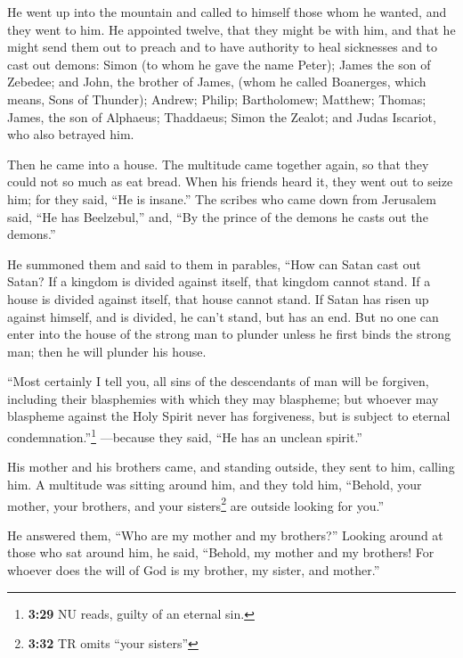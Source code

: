  He went up into the mountain and called to himself those
whom he wanted, and they went to him.  He appointed
twelve, that they might be with him, and that he might send them out to
preach  and to have authority to heal sicknesses and to
cast out demons:  Simon (to whom he gave the name Peter);
 James the son of Zebedee; and John, the brother of
James, (whom he called Boanerges, which means, Sons of Thunder);
 Andrew; Philip; Bartholomew; Matthew; Thomas; James, the
son of Alphaeus; Thaddaeus; Simon the Zealot;  and Judas
Iscariot, who also betrayed him.

Then he came into a house.  The multitude came together
again, so that they could not so much as eat bread.  When
his friends heard it, they went out to seize him; for they said, ``He is
insane.''  The scribes who came down from Jerusalem said,
``He has Beelzebul,'' and, ``By the prince of the demons he casts out
the demons.''

 He summoned them and said to them in parables, ``How can
Satan cast out Satan?  If a kingdom is divided against
itself, that kingdom cannot stand.  If a house is divided
against itself, that house cannot stand.  If Satan has
risen up against himself, and is divided, he can't stand, but has an
end.  But no one can enter into the house of the strong
man to plunder unless he first binds the strong man; then he will
plunder his house.

 ``Most certainly I tell you, all sins of the descendants
of man will be forgiven, including their blasphemies with which they may
blaspheme;  but whoever may blaspheme against the Holy
Spirit never has forgiveness, but is subject to eternal
condemnation.''\footnote{\textbf{3:29} NU reads, guilty of an eternal
  sin.}  ---because they said, ``He has an unclean
spirit.''

 His mother and his brothers came, and standing outside,
they sent to him, calling him.  A multitude was sitting
around him, and they told him, ``Behold, your mother, your brothers, and
your sisters\footnote{\textbf{3:32} TR omits ``your sisters''} are
outside looking for you.''

 He answered them, ``Who are my mother and my brothers?''
 Looking around at those who sat around him, he said,
``Behold, my mother and my brothers!  For whoever does
the will of God is my brother, my sister, and mother.''

